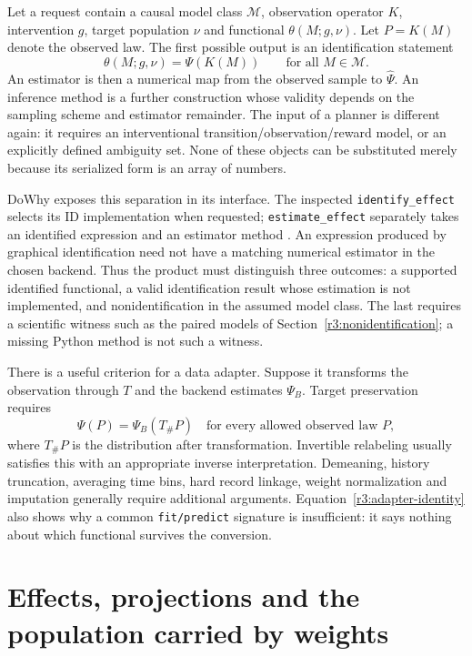 Let a request contain a causal model class $\mathcal M$, observation operator
$K$, intervention $g$, target population $\nu$ and functional
$\theta(M;g,\nu)$. Let $P=K(M)$ denote the observed law. The first possible
output is an identification statement
\[
 \theta(M;g,\nu)=\Psi(K(M))\qquad\text{for all }M\in\mathcal M.
\]
An estimator is then a numerical map from the observed sample to
$\widehat\Psi$. An inference method is a further construction whose
validity depends on the sampling scheme and estimator remainder.
The input of a planner is different again: it requires an interventional
transition/observation/reward model, or an explicitly defined ambiguity set.
None of these objects can be substituted merely because its serialized
form is an array of numbers.

DoWhy exposes this separation in its interface. The inspected
\texttt{identify\_effect} selects its ID implementation when requested;
\texttt{estimate\_effect} separately takes an identified expression and
an estimator method \citep{sw_dowhy}. An expression produced by graphical
identification need not have a matching numerical estimator in the chosen
backend. Thus the product must distinguish three outcomes: a supported
identified functional, a valid identification result whose estimation is
not implemented, and nonidentification in the assumed model class.
The last requires a scientific witness such as the paired models of
Section~\ref{r3:nonidentification}; a missing Python method is not such a
witness.

There is a useful criterion for a data adapter. Suppose it transforms the
observation through $T$ and the backend estimates $\Psi_B$. Target
preservation requires
\begin{equation}
 \Psi(P)=\Psi_B(T_\#P)
 \quad\text{for every allowed observed law }P,
 \label{r3:adapter-identity}
\end{equation}
where $T_\#P$ is the distribution after transformation. Invertible relabeling
usually satisfies this with an appropriate inverse interpretation.
Demeaning, history truncation, averaging time bins, hard record linkage,
weight normalization and imputation generally require additional arguments.
Equation~\eqref{r3:adapter-identity} also shows why a common
\texttt{fit/predict} signature is insufficient: it says nothing about
which functional survives the conversion.

\section{Effects, projections and the population carried by weights}
\label{r3:software-effects}

